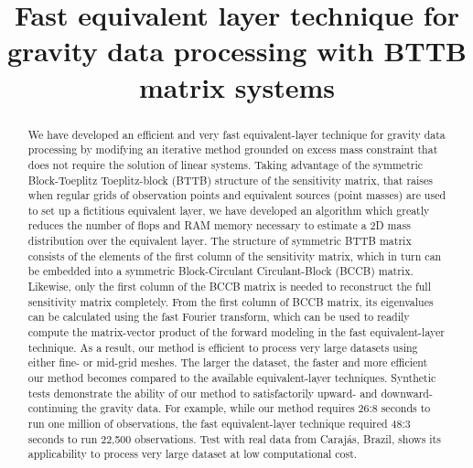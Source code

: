 \documentclass[manuscript,revised]{geophysics}
\begin{document}
\title{Fast equivalent layer technique for gravity data processing with BTTB matrix systems}

\renewcommand{\thefootnote}{\fnsymbol{footnote}} 




\maketitle

\begin{abstract}


We have developed an efficient and very fast equivalent-layer technique for gravity data processing by modifying an iterative method grounded on excess mass constraint that does not require the solution of linear systems. Taking advantage of the symmetric Block-Toeplitz Toeplitz-block (BTTB) structure of the sensitivity matrix, that raises when regular grids of observation points and equivalent sources (point masses) are used to set up a fictitious equivalent layer, we have developed an algorithm which greatly reduces the number of flops and RAM memory necessary to estimate a 2D mass distribution over the equivalent layer. The structure of symmetric BTTB matrix consists of the elements of the first column of the sensitivity matrix, which in turn can be embedded into a symmetric Block-Circulant Circulant-Block (BCCB) matrix. Likewise, only the first column of the BCCB matrix is needed to reconstruct the full sensitivity matrix completely. From the first column of BCCB matrix, its eigenvalues can be calculated using the fast Fourier transform, which can be used to readily compute the matrix-vector product of the forward modeling in the fast equivalent-layer technique. As a result, our method is efficient to process very large datasets using either fine- or mid-grid meshes. The larger the dataset, the faster and more efficient our method becomes compared to the available equivalent-layer techniques. Synthetic tests demonstrate the ability of our method to satisfactorily upward- and downward-continuing the gravity data. For example, while our method requires 26:8 seconds to run one million of observations, the fast equivalent-layer technique required 48:3 seconds to run 22,500 observations. Test with real data from Caraj\'as, Brazil, shows its applicability to process very large dataset at low computational cost.

\end{abstract}
\end{document}
